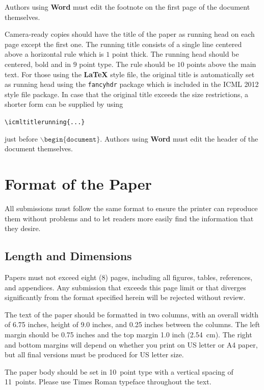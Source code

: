 \documentclass{article}
\begin{document}
\noindent
Authors using \textbf{Word} must edit the
footnote on the first page of the document themselves.

Camera-ready copies should have the title of the paper as running head
on each page except the first one.  The running title consists of a
single line centered above a horizontal rule which is $1$ point thick.
The running head should be centered, bold and in $9$ point type.  The
rule should be $10$ points above the main text.  For those using the
\textbf{\LaTeX} style file, the original title is automatically set as running
head using the {\tt fancyhdr} package which is included in the ICML
2012 style file package.  In case that the original title exceeds the
size restrictions, a shorter form can be supplied by using

\verb|\icmltitlerunning{...}|

just before $\mathtt{\backslash begin\{document\}}$.
Authors using \textbf{Word} must edit the header of the document themselves.

\section{Format of the Paper}

All submissions must follow the same format to ensure the printer can
reproduce them without problems and to let readers more easily find
the information that they desire.

\subsection{Length and Dimensions}

Papers must not exceed eight (8) pages, including all figures, tables,
references, and appendices. Any submission that exceeds this page
limit or that diverges significantly from the format specified herein
will be rejected without review.

The text of the paper should be formatted in two columns, with an
overall width of 6.75 inches, height of 9.0 inches, and 0.25 inches
between the columns. The left margin should be 0.75 inches and the top
margin 1.0 inch (2.54~cm). The right and bottom margins will depend on
whether you print on US letter or A4 paper, but all final versions
must be produced for US letter size.

The paper body should be set in 10~point type with a vertical spacing
of 11~points. Please use Times Roman typeface throughout the text.
\end{document}
